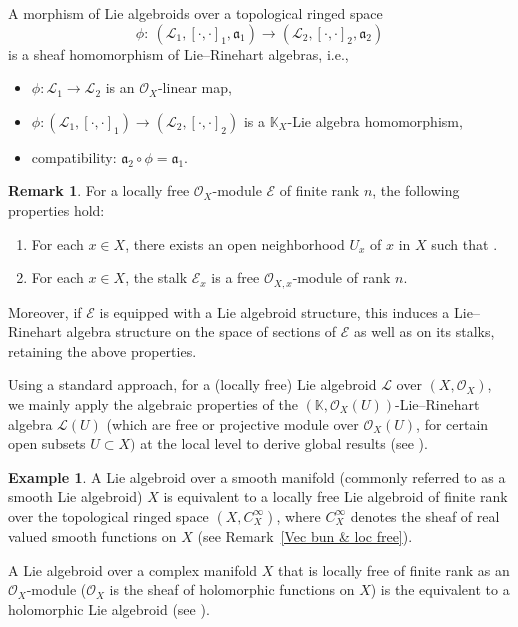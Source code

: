 \documentclass[pdftex]{sigma}
\numberwithin{equation}{section}
\theoremstyle{definition}
\newtheorem{Exm}[Thm]{Example}
\newtheorem{Rem}[Thm]{Remark}
\begin{document}
A morphism of Lie algebroids over a topological ringed space
\[
\phi \colon \ (\mathcal{L}_1,[\cdot,\cdot]_1,\mathfrak{a}_1)\rightarrow (\mathcal{L}_2,[\cdot,\cdot]_2,\mathfrak{a}_2)
\]
 is a sheaf homomorphism of Lie--Rinehart algebras, i.e.,
\begin{itemize}\itemsep=0pt
	\item $\phi\colon \mathcal{L}_1 \rightarrow \mathcal{L}_2$ is an $\mathcal{O}_X$-linear map,
	\item $\phi\colon (\mathcal{L}_1,[\cdot,\cdot]_1)\rightarrow (\mathcal{L}_2,[\cdot,\cdot]_2)$ is a $\mathbb{K}_X$-Lie algebra homomorphism,
	\item compatibility: $\mathfrak{a}_2 \circ \phi= \mathfrak{a}_1$.
\end{itemize}

\begin{Rem} \label{loc free f.r.}
	For a locally free $\mathcal{O}_X$-module $\mathcal{E}$ of finite rank $n$, the following properties hold:%
	\begin{enumerate}\itemsep=0pt
		\item For each $x \in X$, there exists an open neighborhood $U_x$ of $x$ in $X$ such that .
		\item For each $x \in X$, the stalk $\mathcal{E}_x$ is a free $\mathcal{O}_{X,x}$-module of rank $n$.
	\end{enumerate}
	Moreover, if $\mathcal{E}$ is equipped with a Lie algebroid structure, this induces a Lie--Rinehart algebra structure on the space of sections of $\mathcal{E}$ as well as on its stalks, retaining the above properties.
\end{Rem}
Using a standard approach, for a (locally free) Lie algebroid $\mathcal{L}$ over $(X, \mathcal{O}_X)$, we mainly apply the algebraic properties of the $(\mathbb{K}, \mathcal{O}_X(U))$-Lie--Rinehart algebra $\mathcal{L}(U)$ (which are free or projective module over $\mathcal{O}_X(U)$, for certain open subsets $U \subset X)$ at the local level to derive global results (see \cite{UB, BRT, DRV, CV, MK, AA}).
\begin{Exm}
	A Lie algebroid over a smooth manifold (commonly referred to as a smooth Lie algebroid) $X$ is equivalent to a locally free Lie algebroid of finite rank over the topological ringed space $(X, C_X^\infty)$, where $C_X^\infty$ denotes the sheaf of real valued smooth functions on $X$ (see Remark~\ref{Vec bun & loc free}).
	
A Lie algebroid over a complex manifold $X$ that is locally free of finite rank as an $\mathcal{O}_X$-module ($\mathcal{O}_X$ is the sheaf of holomorphic functions on $X$) is the equivalent to a holomorphic Lie algebroid (see \cite{PT2, BP}).
\end{Exm}
\end{document}
